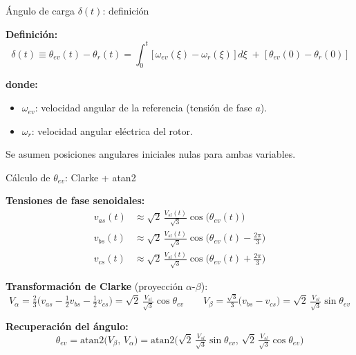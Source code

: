 \documentclass[aspectratio=169,t]{beamer}
\begin{document}
\begin{frame}{Ángulo de carga $\delta(t)$: definición}
\vspace{3mm}

\textbf{Definición:}
\begin{equation*}
\delta(t) \equiv \theta_{ev}(t) - \theta_r(t) = \int_{0}^{t}\!\big[\,\omega_{ev}(\xi) - \omega_r(\xi)\,\big]\,d\xi \;+\; \big[\,\theta_{ev}(0) - \theta_r(0)\,\big]
\end{equation*}

\textbf{donde:}
\begin{itemize}
\item $\omega_{ev}$: velocidad angular de la referencia (tensión de fase $a$).
\item $\omega_r$: velocidad angular eléctrica del rotor.
\end{itemize}

\vspace{2mm}
{\small Se asumen posiciones angulares iniciales nulas para ambas variables.}
\end{frame}

\begin{frame}{Cálculo de $\theta_{ev}$: Clarke + atan2}
\vspace{2mm}

\textbf{Tensiones de fase senoidales:}
\begin{align*}
v_{as}(t) &\approx \sqrt{2}\,\tfrac{V_{sl}(t)}{\sqrt{3}}\cos\!\big(\theta_{ev}(t)\big) \\
v_{bs}(t) &\approx \sqrt{2}\,\tfrac{V_{sl}(t)}{\sqrt{3}}\cos\!\big(\theta_{ev}(t) - \tfrac{2\pi}{3}\big) \\
v_{cs}(t) &\approx \sqrt{2}\,\tfrac{V_{sl}(t)}{\sqrt{3}}\cos\!\big(\theta_{ev}(t) + \tfrac{2\pi}{3}\big)
\end{align*}

\textbf{Transformación de Clarke} (proyección $\alpha$-$\beta$):
\begin{equation*}
V_\alpha = \tfrac{2}{3}\!\big(v_{as} - \tfrac{1}{2}v_{bs} - \tfrac{1}{2}v_{cs}\big) = \sqrt{2}\,\tfrac{V_{sl}}{\sqrt{3}}\cos\theta_{ev}
\qquad
V_\beta = \tfrac{\sqrt{3}}{3}\!\big(v_{bs} - v_{cs}\big) = \sqrt{2}\,\tfrac{V_{sl}}{\sqrt{3}}\sin\theta_{ev}
\end{equation*}

\textbf{Recuperación del ángulo:}
\begin{equation*}
\theta_{ev} = \mathrm{atan2}\!\big(V_\beta,\,V_\alpha\big) = \mathrm{atan2}\!\big(\sqrt{2}\,\tfrac{V_{sl}}{\sqrt{3}}\sin\theta_{ev},\,\sqrt{2}\,\tfrac{V_{sl}}{\sqrt{3}}\cos\theta_{ev}\big)
\end{equation*}
\end{frame}
\end{document}
